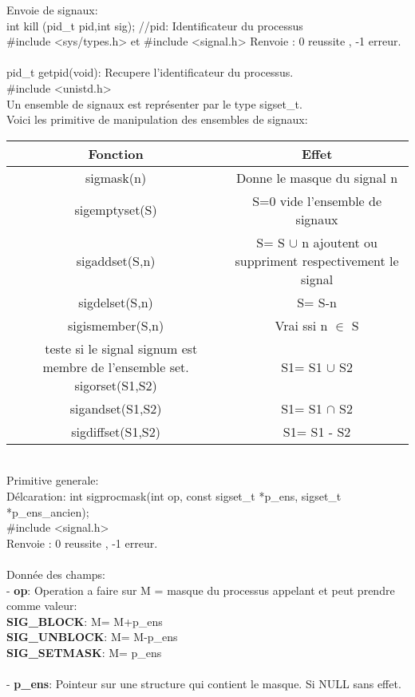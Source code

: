 \documentclass[a4paper,12pt,openany]{book}
\begin{document}
Envoie de signaux:\\
int kill (pid_t pid,int sig); //pid: Identificateur du processus \\
#include <sys/types.h> et #include <signal.h>
Renvoie : 0 reussite , -1 erreur.\\
\\
pid_t getpid(void): Recupere l'identificateur du processus.\\
#include <unistd.h>
\\
Un ensemble de signaux est représenter par le type sigset_t.\\
Voici les primitive de manipulation des ensembles de signaux:\\
\begin{tabular}{|c|c|}
\hline
Fonction & Effet \\ \hline
sigmask(n) & Donne le masque du signal n\\
sigemptyset(S) & S=0  vide l'ensemble de signaux\\
sigaddset(S,n) & S= S $\cup$ n   ajoutent ou suppriment respectivement le signal\\
sigdelset(S,n) & S= S-n\\ \hline
sigismember(S,n) & Vrai ssi n $\in$ S\\  teste si le signal signum est membre de l'ensemble set. \hline
sigorset(S1,S2) & S1= S1 $\cup$ S2\\
sigandset(S1,S2) & S1= S1 $\cap$ S2\\
sigdiffset(S1,S2) & S1= S1 - S2\\ \hline
\end{tabular}
\\
Primitive generale:\\
Délcaration: int sigprocmask(int op, const sigset_t *p_ens, sigset_t *p_ens_ancien);\\
#include <signal.h>\\
Renvoie : 0 reussite , -1 erreur.\\
\\
Donnée des champs:\\
- \textbf{op}: Operation a faire sur M = masque du processus appelant et peut prendre comme valeur:\\
\textbf{SIG_BLOCK}: M= M+p_ens\\
\textbf{SIG_UNBLOCK}: M= M-p_ens\\
\textbf{SIG_SETMASK}: M= p_ens\\
\\
- \textbf{p_ens}: Pointeur sur une structure qui contient le masque. Si NULL sans effet.\\
\end{document}
